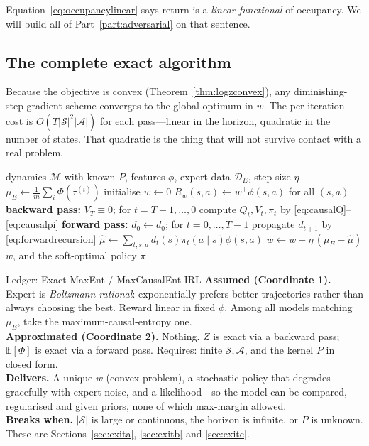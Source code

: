 \documentclass[11pt]{article}
\theoremstyle{plain}
\theoremstyle{definition}
\theoremstyle{remark}
\renewcommand{\S}{\mathcal{S}}
\newcommand{\A}{\mathcal{A}}
\newcommand{\E}{\mathbb{E}}
\begin{document}
Equation~\eqref{eq:occupancylinear} says return is a \emph{linear
functional} of occupancy. We will build all of Part~\ref{part:adversarial}
on that sentence.

\subsection{The complete exact algorithm}

Because the objective is convex (Theorem~\ref{thm:logzconvex}), any
diminishing-step gradient scheme converges to the global optimum in $w$.
The per-iteration cost is $O(T|\S|^2|\A|)$ for each pass---linear in the
horizon, quadratic in the number of states. That quadratic is the thing
that will not survive contact with a real problem.

\begin{algorithm}[H]
\caption{Exact Maximum Causal Entropy IRL (finite $\S,\A$, known $P$)}
\begin{algorithmic}[1]
\Require dynamics $\mathcal{M}$ with known $P$, features $\phi$, expert
data $\mathcal{D}_E$, step size $\eta$
\State $\mu_E \gets \frac1m\sum_i \Phi(\tau^{(i)})$
\State initialise $w\gets0$
  \State $R_w(s,a)\gets w^\top\phi(s,a)$ for all $(s,a)$
  \State \textbf{backward pass:} $V_T\equiv0$; for $t=T-1,\ldots,0$ compute
  $Q_t,V_t,\pi_t$ by \eqref{eq:causalQ}--\eqref{eq:causalpi} 
  \State \textbf{forward pass:} $d_0\gets d_0$; for $t=0,\ldots,T-1$
  propagate $d_{t+1}$ by \eqref{eq:forwardrecursion} 
  \State $\hat\mu \gets \sum_{t,s,a} d_t(s)\pi_t(a\mid s)\phi(s,a)$
  \State $w \gets w + \eta\,(\mu_E - \hat\mu)$ 
\EndFor
\State \Return $w$, and the soft-optimal policy $\pi$
\end{algorithmic}
\label{alg:maxcausalent}
\end{algorithm}

\begin{navybox}{Ledger: Exact MaxEnt / MaxCausalEnt IRL}
\textbf{Assumed (Coordinate 1).} Expert is \emph{Boltzmann-rational}:
exponentially prefers better trajectories rather than always choosing the
best. Reward linear in fixed $\phi$. Among all models matching $\mu_E$,
take the maximum-causal-entropy one.\\
\textbf{Approximated (Coordinate 2).} Nothing. $Z$ is exact via a backward
pass; $\E[\Phi]$ is exact via a forward pass. Requires: finite $\S,\A$, and
the kernel $P$ in closed form.\\
\textbf{Delivers.} A unique $w$ (convex problem), a stochastic policy that
degrades gracefully with expert noise, and a likelihood---so the model can
be compared, regularised and given priors, none of which max-margin
allowed.\\
\textbf{Breaks when.} $|\S|$ is large or continuous, the horizon is
infinite, or $P$ is unknown. These are Sections~\ref{sec:exita},
\ref{sec:exitb} and \ref{sec:exitc}.
\end{navybox}
\end{document}
